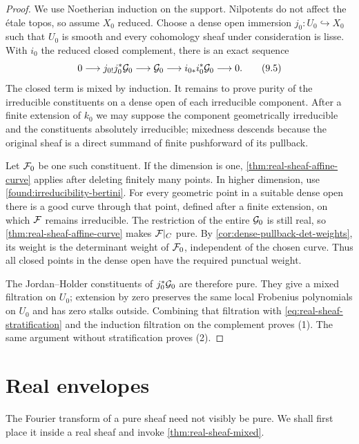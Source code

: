 \begin{proof}
We use Noetherian induction on the support.  Nilpotents do not affect the
\'etale topos, so assume \(X_0\) reduced.  Choose a dense open immersion
\(j_0:U_0\hookrightarrow X_0\) such that \(U_0\) is smooth and every
cohomology sheaf under consideration is lisse.  With \(i_0\) the reduced
closed complement, there is an exact sequence
\[
  0\longrightarrow j_{0!}j_0^*\mathcal G_0
  \longrightarrow\mathcal G_0
  \longrightarrow i_{0*}i_0^*\mathcal G_0
  \longrightarrow0.
\tag{9.5}
\label{eq:real-sheaf-stratification}
\]
The closed term is mixed by induction.  It remains to prove purity of the
irreducible constituents on a dense open of each irreducible component.
After a finite extension of \(k_0\) we may suppose the component
geometrically irreducible and the constituents absolutely irreducible;
mixedness descends because the original sheaf is a direct summand of
finite pushforward of its pullback.

Let \(\mathcal F_0\) be one such constituent.  If the dimension is one,
\cref{thm:real-sheaf-affine-curve} applies after deleting finitely many
points.  In higher dimension, use
\cref{found:irreducibility-bertini}.  For every geometric point in a
suitable dense open there is a good curve through that point, defined
after a finite extension, on which \(\mathcal F\) remains irreducible.  The
restriction of the entire \(\mathcal G_0\) is still real, so
\cref{thm:real-sheaf-affine-curve} makes \(\mathcal F|_C\) pure.  By
\cref{cor:dense-pullback-det-weights}, its weight is the determinant
weight of \(\mathcal F_0\), independent of the chosen curve.  Thus all closed
points in the dense open have the required punctual weight.

The Jordan--Holder constituents of \(j_0^*\mathcal G_0\) are therefore pure.
They give a mixed filtration on \(U_0\); extension by zero preserves the
same local Frobenius polynomials on \(U_0\) and has zero stalks outside.
Combining that filtration with
\eqref{eq:real-sheaf-stratification} and the induction filtration on the
complement proves (1).  The same argument without
stratification proves (2).
\end{proof}

\section{Real envelopes}

The Fourier transform of a pure sheaf need not visibly be pure.  We shall
first place it inside a real sheaf and invoke
\cref{thm:real-sheaf-mixed}.

